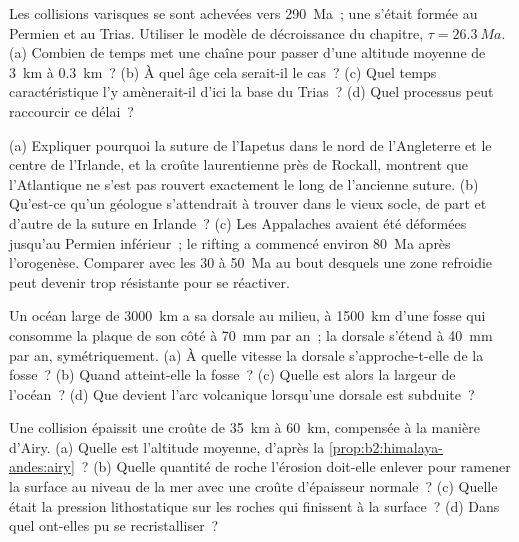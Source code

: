 \begin{exercise}[$\star\star$]\label{exo:b2:wilson-cycle:8}
Les collisions varisques se sont achevées vers \qty{290}{Ma}~; une  s'était formée au Permien et au
Trias. Utiliser le modèle de décroissance du chapitre, $\tau = \qty{26.3}{Ma}$. (a) Combien de temps met une
chaîne pour passer d'une altitude moyenne de \qty{3}{km} à \qty{0.3}{km}~? (b) À quel âge cela serait-il
le cas~? (c) Quel temps caractéristique l'y amènerait-il d'ici la base du Trias~? (d) Quel
processus peut raccourcir ce délai~?
\end{exercise}

\begin{exercise}[$\star\star$]\label{exo:b2:wilson-cycle:9}
(a) Expliquer pourquoi la suture de l'Iapetus dans le nord de l'Angleterre et le centre de l'Irlande, et la croûte
laurentienne près de Rockall, montrent que l'Atlantique ne s'est pas rouvert exactement le long de l'ancienne suture.
(b) Qu'est-ce qu'un géologue s'attendrait à trouver dans le vieux socle, de part et d'autre de la
suture en Irlande~? (c) Les Appalaches avaient été déformées jusqu'au Permien inférieur~; le rifting a commencé
environ 80~Ma après l'orogenèse. Comparer avec les 30 à 50~Ma au bout desquels
une zone refroidie peut devenir trop résistante pour se réactiver.
\end{exercise}

\begin{exercise}[$\star\star\star$]\label{exo:b2:wilson-cycle:10}
Un océan large de \qty{3000}{km} a sa dorsale au milieu, à \qty{1500}{km} d'une fosse qui
consomme la plaque de son côté à \qty{70}{mm} par an~; la dorsale s'étend à \qty{40}{mm} par
an, symétriquement. (a) À quelle vitesse la dorsale s'approche-t-elle de la fosse~? (b) Quand atteint-elle
la fosse~? (c) Quelle est alors la largeur de l'océan~? (d) Que devient l'arc volcanique lorsqu'une dorsale est
subduite~?
\end{exercise}

\begin{exercise}[$\star\star\star$]\label{exo:b2:wilson-cycle:11}
Une collision épaissit une croûte de \qty{35}{km} à \qty{60}{km}, compensée à la manière d'Airy.
(a) Quelle est l'altitude moyenne, d'après la \cref{prop:b2:himalaya-andes:airy}~? (b) Quelle quantité de roche
l'érosion doit-elle enlever pour ramener la surface au niveau de la mer avec une croûte d'épaisseur normale~?
(c) Quelle était la pression lithostatique sur les roches qui finissent à la surface~? (d) Dans quel
 ont-elles pu se recristalliser~?
\end{exercise}

